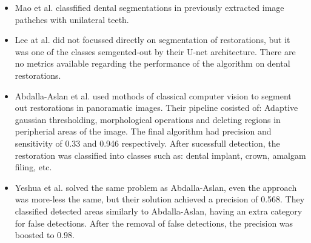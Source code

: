 \begin{itemize}
    \item{Mao et al. \cite{Mao2021}} classfified dental segmentations in previously extracted image pathches with unilateral teeth.
    \item{Lee at al. \cite{Lee2021}} did not focussed directly on segmentation of restorations, but it was one of the classes semgented-out by their U-net architecture. There are no metrics available regarding the performance of the algorithm on dental restorations.
    \item{Abdalla-Aslan et al. \cite{AbdallaAslan2020}} used mothods of classical computer vision to segment out restorations in panoramatic images. Their pipeline cosisted of: Adaptive gaussian thresholding, morphological operations and deleting regions in peripherial areas of the image. The final algorithm had precision and sensitivity of 0.33 and 0.946 respectively. After sucessfull detection, the restoration was classified into classes such as: dental implant, crown, amalgam filing, etc.
    \item {Yeshua et al. \cite{Yeshua2019}} solved the same problem as Abdalla-Aslan, even the approach was more-less the same, but their solution achieved a precision of 0.568. They classified detected areas similarly to Abdalla-Aslan, having an extra category for false detections. After the removal of false detections, the precision was boosted to 0.98.
\end{itemize}